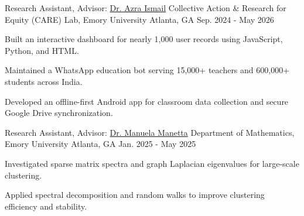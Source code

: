 
\begin{cventries}

  \cventry
    {Research Assistant, Advisor: \href{https://www.azraismail.me/}{Dr. Azra Ismail}} %
    {Collective Action \& Research for Equity (CARE) Lab, Emory University} %
    {Atlanta, GA} %
    {Sep. 2024 - May 2026} %
    {
    \begin{cvitems} %
        \item {Built an interactive dashboard for nearly 1,000 user records using JavaScript, Python, and HTML.}
        \item {Maintained a WhatsApp education bot serving 15,000+ teachers and 600,000+ students across India.}
        \item {Developed an offline-first Android app for classroom data collection and secure Google Drive synchronization.}
    \end{cvitems}
    }

  \cventry
    {Research Assistant, Advisor: \href{https://mannalela.wixsite.com/my-site}{Dr. Manuela Manetta}} %
    {Department of Mathematics, Emory University} %
    {Atlanta, GA} %
    {Jan. 2025 - May 2025} %
    {
    \begin{cvitems} %
        \item {Investigated sparse matrix spectra and graph Laplacian eigenvalues for large-scale clustering.}
        \item {Applied spectral decomposition and random walks to improve clustering efficiency and stability.}    \end{cvitems}
    }
\end{cventries}